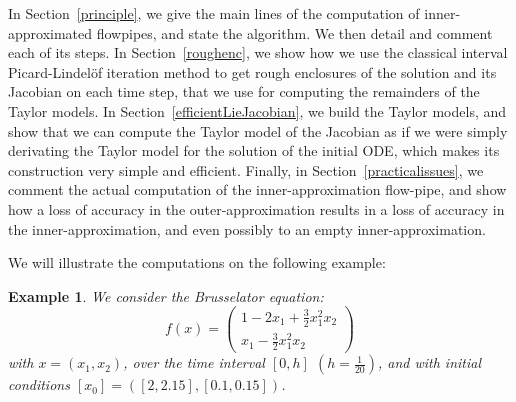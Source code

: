 \documentclass{sig-alternate-05-2015} %
\newtheorem{example}{Example}
\def\intvl#1{\mbox{$[ #1 ]$}}
\begin{document}
In Section~\ref{principle}, we give the main lines of the computation of inner-approximated flowpipes, 
and state the algorithm. We then detail and comment each of its steps. In Section~\ref{roughenc}, we
show how we use the classical interval Picard-Lindel\"of iteration method to get rough
enclosures of the solution and its Jacobian  on each time step, that we use for computing the remainders of the Taylor models.
In Section~\ref{efficientLieJacobian}, we build the Taylor models, and show that  we can compute
the Taylor model of the Jacobian as if we were simply derivating the Taylor model for the solution of the initial ODE, 
which makes its construction very simple and efficient. Finally, in Section~\ref{practicalissues}, we comment the actual 
computation of the inner-approximation flow-pipe, and show how a loss of accuracy in the outer-approximation results in 
a loss of accuracy in the inner-approximation, and even possibly to an empty inner-approximation.

We will illustrate the computations on the following example:
\begin{example}
\label{running0}
We consider the Brusselator equation: 
$$ f(x) = \left(\begin{array}{l}
1-2 x_1+\frac{3}{2} x_1^2 x_2 \\
x_1-\frac{3}{2} x_1^2x_2
\end{array}\right)$$
\noindent with $x=(x_1,x_2)$, over the time interval $\left[0,h\right]$ 
$\left(h=\frac{1}{20}\right)$, and with initial conditions
$\intvl{x_0}=\left([2, 2.15],[0.1, 0.15]\right)$.
\end{example}


\end{document}
